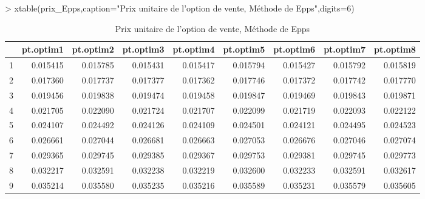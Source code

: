 \documentclass[letter]{report}
\begin{document}
\begin{Schunk}
\begin{Sinput}
> 	xtable(prix_Epps,caption="Prix unitaire de l'option de vente, Méthode de Epps",digits=6)
\end{Sinput}
% latex table generated in R 3.1.0 by xtable 1.7-3 package
% Sat May 24 10:56:20 2014
\begin{table}[ht]
\centering
\begin{tabular}{rrrrrrrrr}
  \hline
 & pt.optim1 & pt.optim2 & pt.optim3 & pt.optim4 & pt.optim5 & pt.optim6 & pt.optim7 & pt.optim8 \\ 
  \hline
1 & 0.015415 & 0.015785 & 0.015431 & 0.015417 & 0.015794 & 0.015427 & 0.015792 & 0.015819 \\ 
  2 & 0.017360 & 0.017737 & 0.017377 & 0.017362 & 0.017746 & 0.017372 & 0.017742 & 0.017770 \\ 
  3 & 0.019456 & 0.019838 & 0.019474 & 0.019458 & 0.019847 & 0.019469 & 0.019843 & 0.019871 \\ 
  4 & 0.021705 & 0.022090 & 0.021724 & 0.021707 & 0.022099 & 0.021719 & 0.022093 & 0.022122 \\ 
  5 & 0.024107 & 0.024492 & 0.024126 & 0.024109 & 0.024501 & 0.024121 & 0.024495 & 0.024523 \\ 
  6 & 0.026661 & 0.027044 & 0.026681 & 0.026663 & 0.027053 & 0.026676 & 0.027046 & 0.027074 \\ 
  7 & 0.029365 & 0.029745 & 0.029385 & 0.029367 & 0.029753 & 0.029381 & 0.029745 & 0.029773 \\ 
  8 & 0.032217 & 0.032591 & 0.032238 & 0.032219 & 0.032600 & 0.032233 & 0.032591 & 0.032617 \\ 
  9 & 0.035214 & 0.035580 & 0.035235 & 0.035216 & 0.035589 & 0.035231 & 0.035579 & 0.035605 \\ 
   \hline
\end{tabular}
\caption{Prix unitaire de l'option de vente, Méthode de Epps} 
\end{table}\end{Schunk}
\end{document}
